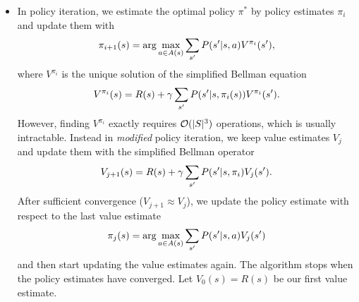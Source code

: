 \documentclass[11pt, a4paper]{article}
\begin{document}
\begin{enumerate}
\begin{solution}
\begin{itemize}
            \item In policy iteration, we estimate the optimal policy $\pi^*$ by policy estimates $\pi_i$ and update them with
            \begin{equation*}
                \pi_{i+1}(s) = \arg \max_{a \in A(s)} \sum_{s'} P(s' \vert s, a) V^{\pi_i}(s'),
            \end{equation*}
            where $V^{\pi_i}$ is the unique solution of the simplified Bellman equation
            \begin{equation*}
                V^{\pi_i}(s) = R(s) + \gamma \sum_{s'} P(s' \vert s, \pi_i(s)) V^{\pi_i}(s') .
            \end{equation*}
            However, finding $V^{\pi_i}$ exactly requires $\mathcal{O}(\lvert S\rvert^3)$ operations, which is usually intractable. Instead in \emph{modified} policy iteration, we keep value estimates $V_j$ and update them with the simplified Bellman operator
            \begin{equation*}
                V_{j + 1}(s) = R(s) + \gamma \sum_{s'} P(s' \vert s, \pi_i) V_j(s') .
            \end{equation*}
            After sufficient convergence ($V_{j+1} \approx V_{j}$), we update the policy estimate with respect to the last value estimate
            \begin{equation*}
                \pi_j(s) = \arg \max_{a \in A(s)} \sum_{s'} P(s' \vert s, a) V_j(s')
            \end{equation*}
            and then start updating the value estimates again. The algorithm stops when the policy estimates have converged. Let $V_0(s) = R(s)$ be our first value estimate.


\end{itemize}
\end{solution}
\end{enumerate}
\end{document}
